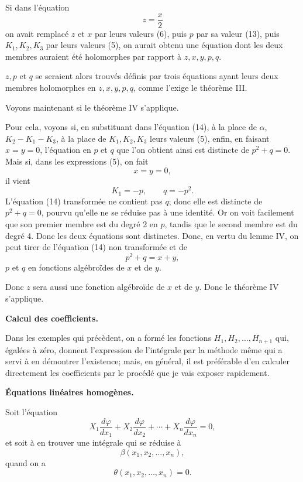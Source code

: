 \documentclass[11pt]{article}
\begin{document}
Si dans l’équation
\[
z=\frac{x}{2}
\]
on avait remplacé $z$ et $x$ par leurs valeurs (6), puis $p$ par sa valeur (13), puis $K_1,K_2,K_3$ par leurs valeurs (5), on aurait obtenu une équation dont les deux membres auraient été holomorphes par rapport à $z,x,y,p,q$.

$z,p$ et $q$ se seraient alors trouvés définis par trois équations ayant leurs deux membres holomorphes en $z,x,y,p,q$, comme l’exige le théorème III.

Voyons maintenant si le théorème IV s’applique.

Pour cela, voyons si, en substituant dans l’équation (14), à la place de $\alpha$, $K_2-K_1-K_3$, à la place de $K_1,K_2,K_3$ leurs valeurs (5), enfin, en faisant $x=y=0$, l’équation en $p$ et $q$ que l’on obtient ainsi est distincte de $p^2+q=0$. Mais si, dans les expressions (5), on fait
\[
x=y=0,
\]
il vient
\[
K_1=-p,
\qquad q=-p^2.
\]
L’équation (14) transformée ne contient pas $q$; donc elle est distincte de $p^2+q=0$, pourvu qu’elle ne se réduise pas à une identité. Or on voit facilement que son premier membre est du degré 2 en $p$, tandis que le second membre est du degré 4. Donc les deux équations sont distinctes. Donc, en vertu du lemme IV, on peut tirer de l’équation (14) non transformée et de
\[
p^2+q=x+y,
\]
$p$ et $q$ en fonctions algébroïdes de $x$ et de $y$.

Donc $z$ sera aussi une fonction algébroïde de $x$ et de $y$. Donc le théorème IV s’applique.



\begin{center}
{\bfseries Calcul des coefficients.}
\end{center}

Dans les exemples qui précèdent, on a formé les fonctions $H_1,H_2,\ldots,H_{n+1}$ qui, égalées à zéro, donnent l’expression de l’intégrale par la méthode même qui a servi à en démontrer l’existence; mais, en général, il est préférable d’en calculer directement les coefficients par le procédé que je vais exposer rapidement.

\begin{center}
{\bfseries Équations linéaires homogènes.}
\end{center}

Soit l’équation
\[
X_1\frac{d\varphi}{dx_1}+X_2\frac{d\varphi}{dx_2}+\cdots+X_n\frac{d\varphi}{dx_n}=0,
\]
et soit à en trouver une intégrale qui se réduise à
\[
\beta(x_1,x_2,\ldots,x_n),
\]
quand on a
\[
\theta(x_1,x_2,\ldots,x_n)=0.
\]
\end{document}
